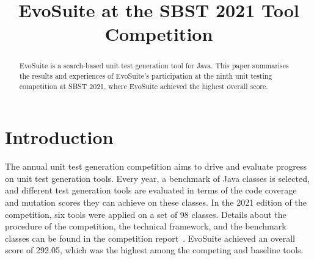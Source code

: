 \documentclass[10pt,conference]{IEEEtran}
\newcommand{\andrea}[1]{\textcolor{ScarletRed}{\sf\small\textbf{Andrea:} #1}}
\newcommand{\EVOSUITE}{{\sc EvoSuite}\xspace}
\begin{document}
% 

\title{\EVOSUITE at the SBST 2021 Tool Competition}
 

\author{%
%
%
%
}

\maketitle

\begin{abstract}
  \EVOSUITE is a search-based unit test generation tool for Java. This paper summarises the results and experiences of \EVOSUITE's participation at the ninth unit testing competition at SBST 2021, where \EVOSUITE achieved the highest overall score.
\end{abstract}



\section{Introduction}
%
The annual unit test generation competition aims to drive and evaluate progress
on unit test generation tools. Every year, a benchmark of Java classes is
selected, and different test generation tools are evaluated in terms of the
code coverage and mutation scores they can achieve on these classes. In the
2021 edition of the competition, six tools were applied on a set of 98 classes.
Details about the procedure of the competition, the technical framework, and
the benchmark classes can be found in the competition report~\cite{SBST:2021}.
\EVOSUITE achieved an overall score of 292.05, which was the highest among the
competing and baseline tools.
\end{document}
